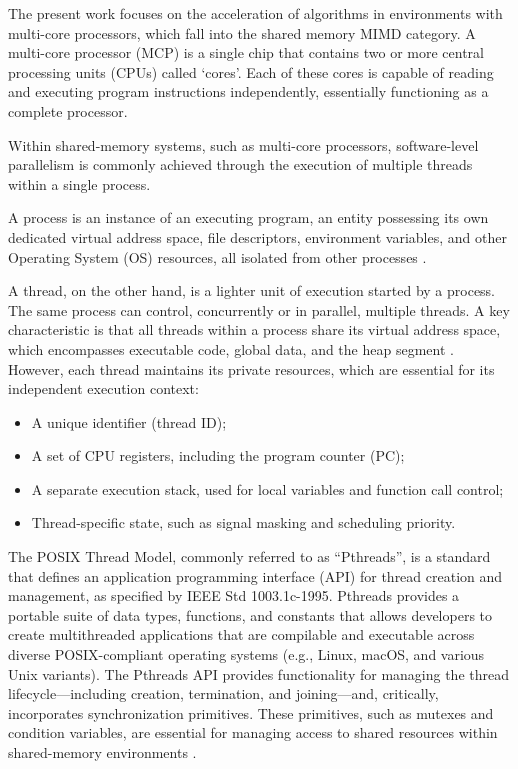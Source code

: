 The present work focuses on the acceleration of algorithms in environments with multi-core processors, which fall into the shared memory MIMD category. A multi-core processor (MCP) is a single chip that contains two or more central processing units (CPUs) called ‘cores’. Each of these cores is capable of reading and executing program instructions independently, essentially functioning as a complete processor.


Within shared-memory systems, such as multi-core processors, software-level parallelism is commonly achieved through the execution of multiple threads within a single process.

A process is an instance of an executing program, an entity possessing its own dedicated virtual address space, file descriptors, environment variables, and other Operating System (OS) resources, all isolated from other processes \cite{Pacheco2011}.

A thread, on the other hand, is a lighter unit of execution started by a process. The same process can control, concurrently or in parallel, multiple threads. A key characteristic is that all threads within a process share its virtual address space, which encompasses executable code, global data, and the heap segment \cite{Pacheco2011}. However, each thread maintains its private resources, which are essential for its independent execution context:
\begin{itemize}
    \item A unique identifier (thread ID);
    \item A set of CPU registers, including the program counter (PC);
    \item A separate execution stack, used for local variables and function call control;
    \item Thread-specific state, such as signal masking and scheduling priority.
\end{itemize}


The POSIX Thread Model, commonly referred to as “Pthreads”, is a standard that defines an application programming interface (API) for thread creation and management, as specified by IEEE Std 1003.1c-1995. Pthreads provides a portable suite of data types, functions, and constants that allows developers to create multithreaded applications that are compilable and executable across diverse POSIX-compliant operating systems (e.g., Linux, macOS, and various Unix variants). The Pthreads API provides functionality for managing the thread lifecycle—including creation, termination, and joining—and, critically, incorporates synchronization primitives. These primitives, such as mutexes and condition variables, are essential for managing access to shared resources within shared-memory environments \cite{Butenhof1997} \cite{Pacheco2011}.

